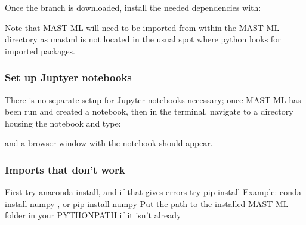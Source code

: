 \documentclass[letterpaper,10pt,english]{sphinxmanual}
\begin{document}
\begin{sphinxVerbatim}[commandchars=\\\{\}]
     
\end{sphinxVerbatim}

Once the branch is downloaded, install the needed dependencies with:

\begin{sphinxVerbatim}[commandchars=\\\{\}]
   
\end{sphinxVerbatim}

Note that MAST-ML will need to be imported from within the MAST-ML directory as mastml is not
located in the usual spot where python looks for imported packages.


\subsubsection{Set up Juptyer notebooks}
\label{\detokenize{0_1_terminal_installation:set-up-juptyer-notebooks}}
There is no separate setup for Jupyter notebooks necessary;
once MAST-ML has been run and created a notebook, then in the terminal,
navigate to a directory housing the notebook and type:

\begin{sphinxVerbatim}[commandchars=\\\{\}]
 
\end{sphinxVerbatim}

and a browser window with the notebook should appear.


\subsubsection{Imports that don’t work}
\label{\detokenize{0_1_terminal_installation:imports-that-dont-work}}
First try anaconda install, and if that gives errors try pip install
Example: conda install numpy , or pip install numpy
Put the path to the installed MAST-ML folder in your PYTHONPATH if it isn’t already
\end{document}
